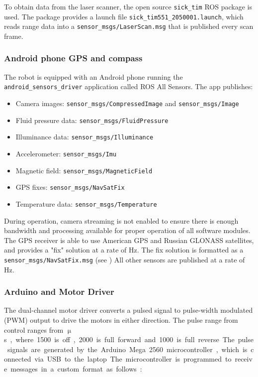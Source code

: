 \documentclass[titlepage,12pt,a4paper]{article}
\begin{document}
To obtain data from the laser scanner, the open source \verb|sick_tim| ROS package is used. The package provides a launch file \verb|sick_tim551_2050001.launch|, which reads range data into a \verb|sensor_msgs/LaserScan.msg| that is published every scan frame.

\subsubsection{Android phone GPS and compass}

The robot is equipped with an Android phone running the \verb|android_sensors_driver| application called ROS All Sensors. The app publishes:

\begin{itemize}
	\item Camera images: \verb|sensor_msgs/CompressedImage| and \verb|sensor_msgs/Image|
	\item Fluid pressure data: \verb|sensor_msgs/FluidPressure|
	\item Illuminance data: \verb|sensor_msgs/Illuminance|
	\item Accelerometer: \verb|sensor_msgs/Imu|
	\item Magnetic field: \verb|sensor_msgs/MagneticField|
	\item GPS fixes: \verb|sensor_msgs/NavSatFix|
	\item Temperature data: \verb|sensor_msgs/Temperature| \\
\end{itemize}

During operation, camera streaming is not enabled to ensure there is enough bandwidth and processing available for proper operation of all software modules. The GPS receiver is able to use American GPS and Russian GLONASS satellites, and provides a "fix" solution at a rate of \unit[1]{Hz}. The fix solution is formatted as a \verb|sensor_msgs/NavSatFix.msg| (see ) All other sensors are published at a rate of \unit[50]{Hz}.

\subsubsection{Arduino and Motor Driver}

The dual-channel motor driver converts a pulsed signal to pulse-width modulated (PWM) output to drive the motors in either direction. The pulse range from control ranges from \unit[1000-2000]{$\upmu$s}, where 1500 is off, 2000 is full forward and 1000 is full reverse. The pulse signals are generated by the Arduino Mega 2560 microcontroller, which is connected via USB to the laptop. The microcontroller is programmed to receive messages in a custom format as follows:
\end{document}
